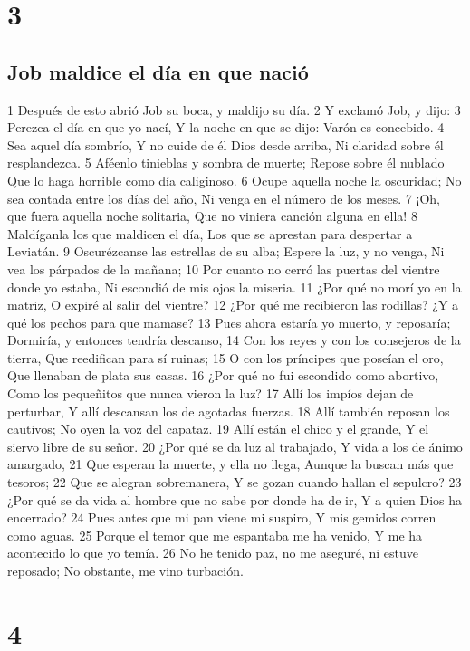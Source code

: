 \chapter{3}

\section*{Job maldice el día en que nació}


1 Después de esto abrió Job su boca, y maldijo su día. 
2 Y exclamó Job, y dijo:
3 Perezca el día en que yo nací,
Y la noche en que se dijo: Varón es concebido.
4 Sea aquel día sombrío,
Y no cuide de él Dios desde arriba,
Ni claridad sobre él resplandezca.
5 Aféenlo tinieblas y sombra de muerte;
Repose sobre él nublado
Que lo haga horrible como día caliginoso.
6 Ocupe aquella noche la oscuridad;
No sea contada entre los días del año,
Ni venga en el número de los meses.
7 ¡Oh, que fuera aquella noche solitaria,
Que no viniera canción alguna en ella!
8 Maldíganla los que maldicen el día,
Los que se aprestan para despertar a Leviatán.
9 Oscurézcanse las estrellas de su alba;
Espere la luz, y no venga,
Ni vea los párpados de la mañana;
10 Por cuanto no cerró las puertas del vientre donde yo estaba,
Ni escondió de mis ojos la miseria.
11 ¿Por qué no morí yo en la matriz,
O expiré al salir del vientre?
12 ¿Por qué me recibieron las rodillas?
¿Y a qué los pechos para que mamase?
13 Pues ahora estaría yo muerto, y reposaría;
Dormiría, y entonces tendría descanso,
14 Con los reyes y con los consejeros de la tierra,
Que reedifican para sí ruinas;
15 O con los príncipes que poseían el oro,
Que llenaban de plata sus casas.
16 ¿Por qué no fui escondido como abortivo,
Como los pequeñitos que nunca vieron la luz?
17 Allí los impíos dejan de perturbar,
Y allí descansan los de agotadas fuerzas.
18 Allí también reposan los cautivos;
No oyen la voz del capataz.
19 Allí están el chico y el grande,
Y el siervo libre de su señor. 
20 ¿Por qué se da luz al trabajado,
Y vida a los de ánimo amargado,
21 Que esperan la muerte, y ella no llega, 
Aunque la buscan más que tesoros; 
22 Que se alegran sobremanera,
Y se gozan cuando hallan el sepulcro?
23 ¿Por qué se da vida al hombre que no sabe por donde ha de ir,
Y a quien Dios ha encerrado?
24 Pues antes que mi pan viene mi suspiro,
Y mis gemidos corren como aguas.
25 Porque el temor que me espantaba me ha venido,
Y me ha acontecido lo que yo temía.
26 No he tenido paz, no me aseguré, ni estuve reposado;
No obstante, me vino turbación.

\chapter{4}

